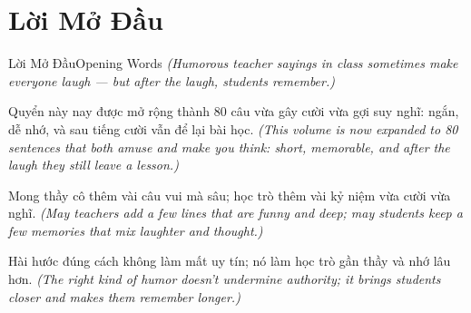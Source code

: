 \chapter*{Lời Mở Đầu}

\begin{truyen}{Lời Mở Đầu}{Opening Words}
\textit{(Humorous teacher sayings in class sometimes make everyone laugh — but after the laugh, students remember.)}

Quyển này nay được mở rộng thành 80 câu vừa gây cười vừa gợi suy nghĩ: ngắn, dễ nhớ, và sau tiếng cười vẫn để lại bài học.
\textit{(This volume is now expanded to 80 sentences that both amuse and make you think: short, memorable, and after the laugh they still leave a lesson.)}

Mong thầy cô thêm vài câu vui mà sâu; học trò thêm vài kỷ niệm vừa cười vừa nghĩ.
\textit{(May teachers add a few lines that are funny and deep; may students keep a few memories that mix laughter and thought.)}
\end{truyen}

\begin{baihoc}
Hài hước đúng cách không làm mất uy tín; nó làm học trò gần thầy và nhớ lâu hơn.
\textit{(The right kind of humor doesn't undermine authority; it brings students closer and makes them remember longer.)}
\end{baihoc}
\ngancach
